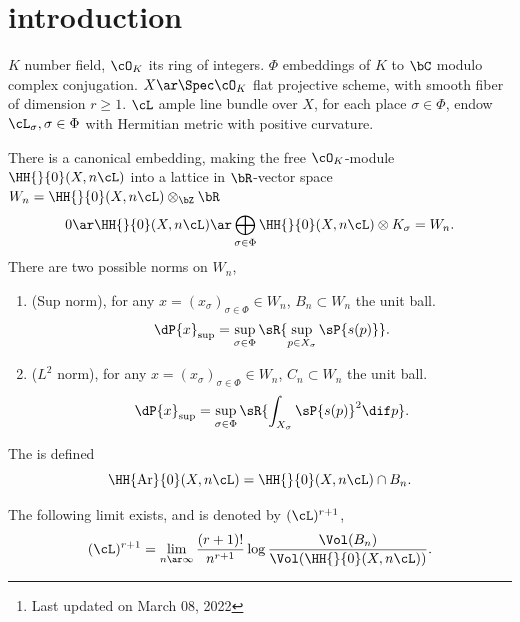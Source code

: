 

\title{}
\author{ by Cong Wen, 03/2022}
\date{}


\maketitle
\thispagestyle{empty}
\begin{abstract}
  This is my self-use notes\footnote{Last updated on March 08, 2022} on \cite{AB1995}. Please reach out if you find anything incorrect.
\end{abstract}
\tableofcontents




\section{introduction}
\begin{stp}
  $K$ number field, $\cO_{K}$ its ring of integers. $\Phi$ embeddings of $K$ to $\bC$ modulo complex conjugation. $X\ar\Spec\cO_{K}$ flat projective scheme, with smooth fiber of dimension $r\geq 1$. $\cL$ ample line bundle over $X$, for each place $\sigma\in\Phi$, endow $\cL_{\sigma}, \sigma\in\Phi$ with Hermitian metric with positive curvature.


  There is a canonical embedding, making the free $\cO_{K}$-module $\HH{}{0}(X,n\cL)$ into a lattice in $\bR$-vector space $W_{n}=\HH{}{0}(X,n\cL)\otimes_{\bZ}\bR$
  \[
    0\ar\HH{}{0}(X,n\cL)\ar\bigoplus_{\sigma\in\Phi}\HH{}{0}(X,n\cL)\otimes K_{\sigma}=W_{n}.
  \]
  There are two possible norms on $W_{n}$,
  \begin{enumerate}
    \item (Sup norm), for any $x=(x_{\sigma})_{\sigma\in\Phi}\in W_{n}$, $B_{n}\subset W_{n}$ the unit ball.
          \[
            \dP{x}_{\mathrm{sup}}=\sup_{\sigma\in\Phi}\sR{\sup_{p\in X_{\sigma}}\sP{s(p)}}.
          \]
    \item ($L^{2}$ norm), for any $x=(x_{\sigma})_{\sigma\in\Phi}\in W_{n}$, $C_{n}\subset W_{n}$ the unit ball.
          \[
            \dP{x}_{\mathrm{sup}}=\sup_{\sigma\in\Phi}\sR{\int_{X_{\sigma}}\sP{s(p)}^{2}\dif p}.
          \]
  \end{enumerate}

  The  is defined
  \[
    \HH{\mathrm{Ar}}{0}(X,n\cL)=\HH{}{0}(X,n\cL)\cap B_{n}.
  \]
\end{stp}
\begin{thm}\label{thm:supub}
  The following limit exists, and is denoted by $(\cL)^{r+1}$,
  \[
    (\cL)^{r+1}=\lim_{n\ar\infty}\frac{(r+1)!}{n^{r+1}}\log\frac{\Vol(B_{n})}{\Vol(\HH{}{0}(X,n\cL))}.
  \]
\end{thm}

